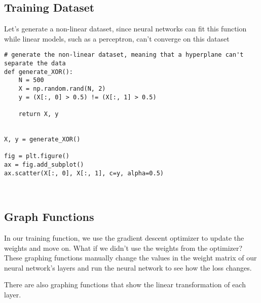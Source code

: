 \documentclass[openany]{book}
\begin{document}
    \subsection{Training Dataset}\label{training-dataset}

Let's generate a non-linear dataset, since neural networks can fit this
function while linear models, such as a perceptron, can't converge on
this dataset

\begin{tcolorbox}
\tiny
\begin{verbatim}
# generate the non-linear dataset, meaning that a hyperplane can't separate the data
def generate_XOR():
    N = 500
    X = np.random.rand(N, 2)
    y = (X[:, 0] > 0.5) != (X[:, 1] > 0.5)

    return X, y


X, y = generate_XOR()

fig = plt.figure()
ax = fig.add_subplot()
ax.scatter(X[:, 0], X[:, 1], c=y, alpha=0.5)
\end{verbatim}
\end{tcolorbox}
        
    \begin{center}
    \end{center}
    { \hspace*{\fill} \\}
    
    \subsection{Graph Functions}\label{graph-functions}

In our training function, we use the gradient descent optimizer to
update the weights and move on. What if we didn't use the weights from
the optimizer? These graphing functions manually change the values in
the weight matrix of our neural network's layers and run the neural
network to see how the loss changes.

There are also graphing functions that show the linear transformation of
each layer.
\end{document}
